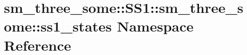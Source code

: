 \hypertarget{namespacesm__three__some_1_1SS1_1_1sm__three__some_1_1ss1__states}{}\section{sm\+\_\+three\+\_\+some\+:\+:S\+S1\+:\+:sm\+\_\+three\+\_\+some\+:\+:ss1\+\_\+states Namespace Reference}
\label{namespacesm__three__some_1_1SS1_1_1sm__three__some_1_1ss1__states}
